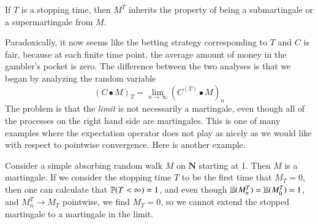\begin{theorem}
    If $T$ is a stopping time, then $M^T$ inherits the property of being a submartingale or a supermartingale from $M$.
\end{theorem}

Paradoxically, it now seems like the betting strategy corresponding to $T$ and $C$ is fair, because at each finite time point, the average amount of money in the gambler's pocket is zero. The difference between the two analyses is that we began by analyzing the random variable
%
\[ (C \bullet M)_T = \lim_{n \to \infty} (C^{(T)} \bullet M)_n \]
%
The problem is that the \emph{limit} is not necessarily a martingale, even though all of the processes on the right hand side are martingales. This is one of many examples where the expectation operator does not play as nicely as we would like with respect to pointwise convergence. Here is another example.

\begin{example}
    Consider a simple absorbing random walk $M$ on $\mathbf{N}$ starting at 1. Then $M$ is a martingale. If we consider the stopping time $T$ to be the first time that $M_T = 0$, then one can calculate that $\operatorname{\mathbb{P}}(T < \infty) = 1$, and even though $\operatorname{\mathbb{E}}(M^T_n) = \operatorname{\mathbb{E}}(M^T_0) = 1$, and $M^T_n \to M_T$ pointwise, we find $M_T = 0$, so we cannot extend the stopped martingale to a martingale in the limit.
\end{example}

